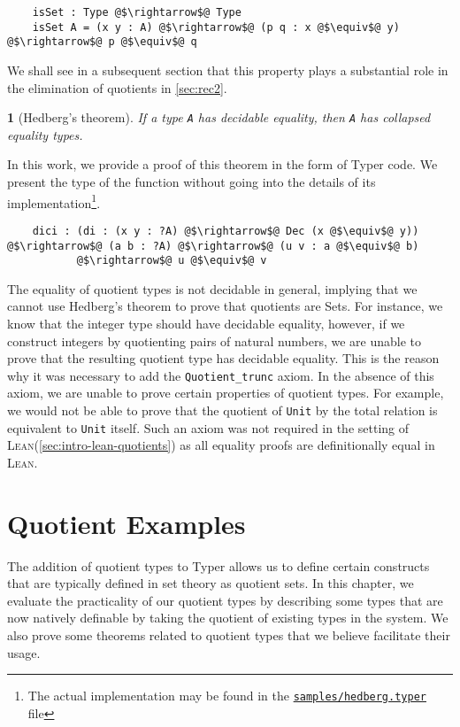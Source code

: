 \documentclass[12pt,twoside,maitrise]{dms}
\newtheorem{theo}[cor]{\theoremname}
\theoremstyle{definition}
\numberwithin{equation}{section}
\numberwithin{table}{chapter}
\numberwithin{figure}{chapter}
\newcommand\id[1] {\texttt{#1}}
\newcommand\fn[1] {\texttt{#1}}
\def\Lean{\textsc{Lean}\xspace}
\begin{document}
\begin{verbatim}
    isSet : Type @$\rightarrow$@ Type
    isSet A = (x y : A) @$\rightarrow$@ (p q : x @$\equiv$@ y) @$\rightarrow$@ p @$\equiv$@ q
\end{verbatim}

We shall see in a subsequent section that this property plays a substantial role
in the elimination of quotients in \autoref{sec:rec2}.

\begin{theo}[Hedberg's theorem\cite{hedberg1998coherence}]
If a type \fn{A} has decidable equality, then \fn{A} has collapsed equality
types.
\end{theo}

In this work, we provide a proof of this theorem in the form of Typer code. We
present the type of the function without going into the details of its
implementation\footnote{The actual implementation may be found in the
\href{https://gitlab.com/jamestjw/typer/-/blob/quot-types-v1.0.0/samples/hedberg.typer}{\id{samples/hedberg.typer}}
file}.

\begin{verbatim}
    dici : (di : (x y : ?A) @$\rightarrow$@ Dec (x @$\equiv$@ y)) @$\rightarrow$@ (a b : ?A) @$\rightarrow$@ (u v : a @$\equiv$@ b)
           @$\rightarrow$@ u @$\equiv$@ v
\end{verbatim}

The equality of quotient types is not decidable in general, implying that we
cannot use Hedberg's theorem to prove that quotients are Sets. For instance, we
know that the integer type should have decidable equality, however, if we
construct integers by quotienting pairs of natural numbers, we are unable to
prove that the resulting quotient type has decidable equality. This is the
reason why it was necessary to add the \id{Quotient\_trunc} axiom. In the
absence of this axiom, we are unable to prove certain properties of quotient
types. For example, we would not be able to prove that the quotient of
\id{Unit} by the total relation is equivalent to \id{Unit}
itself\cite{vezzosi2021cubical}. Such an axiom was not required in the setting
of \Lean{}(\autoref{sec:intro-lean-quotients}) as all equality proofs are
definitionally equal in \Lean{}.

\chapter{Quotient Examples}\label{ch:quot-examples}
The addition of quotient types to Typer allows us to define certain constructs
that are typically defined in set theory as quotient sets. In this chapter, we
evaluate the practicality of our quotient types by describing some types that
are now natively definable by taking the quotient of existing types in the
system. We also prove some theorems related to quotient types that we believe
facilitate their usage.
\end{document}
